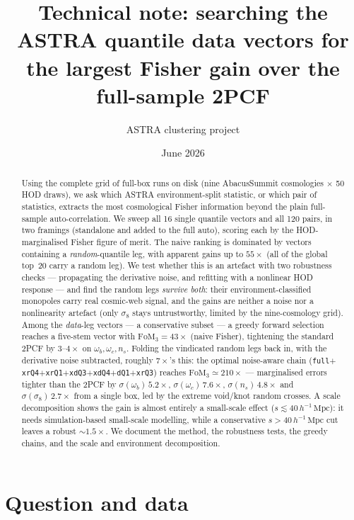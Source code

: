 \documentclass[11pt]{article}
\title{Technical note: searching the ASTRA quantile data vectors for the
largest Fisher gain over the full-sample 2PCF}
\author{ASTRA clustering project}
\date{June 2026}
\newcommand{\Mpch}{\,h^{-1}\,\mathrm{Mpc}}
\newcommand{\FoM}{\mathrm{FoM}}
\newcommand{\code}[1]{\texttt{#1}}
\begin{document}
\maketitle

\begin{abstract}
Using the complete grid of full-box runs on disk (nine AbacusSummit
cosmologies $\times$ 50 HOD draws), we ask which ASTRA environment-split
statistic, or which pair of statistics, extracts the most cosmological
Fisher information beyond the plain full-sample auto-correlation.  We sweep
all 16 single quantile vectors and all 120 pairs, in two framings
(standalone and added to the full auto), scoring each by the
HOD-marginalised Fisher figure of merit.  The naive ranking is dominated by
vectors containing a \emph{random}-quantile leg, with apparent gains up to
$55\times$ (all of the global top~20 carry a random leg).  We test whether this
is an artefact with two robustness checks --- propagating the derivative noise,
and refitting with a nonlinear HOD response --- and find the random legs
\emph{survive both}: their environment-classified monopoles carry real cosmic-web
signal, and the gains are neither a noise nor a nonlinearity artefact (only
$\sigma_8$ stays untrustworthy, limited by the nine-cosmology grid).  Among the
\emph{data}-leg vectors --- a conservative subset --- a greedy forward selection
reaches a five-stem vector with $\FoM_3 = 43\times$ (naive Fisher), tightening the
standard 2PCF by $3$--$4\times$ on $\omega_b,\omega_c,n_s$.  Folding the
vindicated random legs back in, with the derivative noise subtracted, roughly
$7\times$'s this: the optimal noise-aware chain
(\code{full}$+$\code{xrQ4}$+$\code{xrQ1}$+$\code{xdQ3}$+$\code{xdQ4}$+$\code{dQ1}$+$\code{xrQ3})
reaches $\FoM_3 \simeq 210\times$ --- marginalised errors tighter than the 2PCF by
$\sigma(\omega_b)\,5.2\times$, $\sigma(\omega_c)\,7.6\times$, $\sigma(n_s)\,4.8\times$
and $\sigma(\sigma_8)\,2.7\times$ from a single box, led by the extreme void/knot
random crosses.  A scale decomposition shows the gain is almost entirely a
small-scale effect ($s\lesssim40\Mpch$): it needs simulation-based small-scale
modelling, while a conservative $s>40\Mpch$ cut leaves a robust $\sim\!1.5\times$.
We document the method, the robustness tests, the greedy chains, and the scale and
environment decomposition.
\end{abstract}

\section{Question and data}
\end{document}
